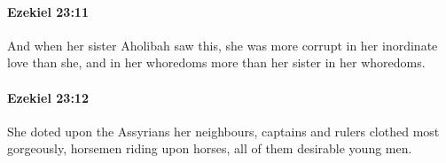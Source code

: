 		\paragraph{Ezekiel 23:11} %
			\label{EZEKIEL-23-11}

			And when her sister Aholibah saw this, she was more corrupt in her inordinate love than she, and in her whoredoms more than her sister in her whoredoms.


		\paragraph{Ezekiel 23:12} %
			\label{EZEKIEL-23-12}

			She doted upon the Assyrians her neighbours, captains and rulers clothed most gorgeously, horsemen riding upon horses, all of them desirable young men.


